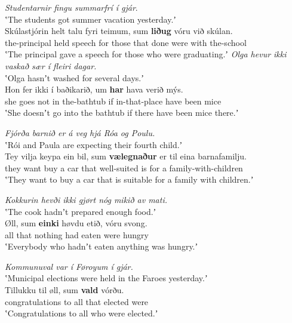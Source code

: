 \documentclass[output=paper]{LSP/langsci}
\begin{document}
\ea%
\label{ex:Thrainsson:12}
	\ea \small\let\eachwordone=\small\let\eachwordtwo=\small\textit{Studentarnir fingu summarfrí í gjár}.\\
	\glt ʽThe students got summer vacation yesterday.ʼ\\
	\gll Skúlastjórin     helt   talu     fyri   teimum,   sum   \textbf{liðug}   vóru   við   skúlan.\\
	the-principal   held   speech   for   those     that   done   were   with   the-school\\
	\glt ʽThe principal gave a speech for those who were graduating.ʼ
\newpage 
	\ex \normalsize\let\eachwordone=\normalsize\let\eachwordtwo=\normalsize\textit{Olga hevur ikki vaskað sær í fleiri dagar.}\\
	\glt ʽOlga hasnʼt washed for several days.ʼ\\
	\gll Hon   fer   ikki   í baðikarið,     um \textbf{har}         hava   verið   mýs.\\
	she  goes  not    in the-bathtub   if    in-that-place  have   been   mice\\
    \glt	ʽShe doesnʼt go into the bathtub if there have been mice there.ʼ

    \ex \small\let\eachwordone=\small\let\eachwordtwo=\small\textit{Fjórða barnið er á veg hjá Róa og Poulu.}\\
	\glt    ʽRói and Paula are expecting their fourth child.ʼ\\
    \gll    Tey   vilja   keypa   ein bil,   sum   \textbf{vælegnaður}   er   til   eina   barnafamilju.\\
            they  want  buy    a car    that  well-suited    is   for a     family-with-children\\
    \glt    ʽThey want to buy a car that is suitable for a family with children.ʼ

	\ex \normalsize\let\eachwordone=\normalsize\let\eachwordtwo=\normalsize\textit{Kokkurin hevði ikki gjørt nóg mikið av mati.}\\
	\glt ʽThe cook hadnʼt prepared enough food.ʼ\\
	\gll Øll,   sum   \textbf{einki}     høvdu   etið,   vóru   svong.\\
	all     that   nothing   had     eaten   were   hungry\\
	\glt ʽEverybody who hadnʼt eaten anything was hungry.ʼ

	\ex \textit{Kommunuval var í Føroyum í gjár.}\\
	\glt ʽMunicipal elections were held in the Faroes yesterday.ʼ\\
	\gll	Tillukku       til øll,   sum   \textbf{vald}     vórðu.\\
		congratulations   to all     that   elected   were \\
	\glt ʽCongratulations to all who were elected.ʼ
\end{document}
